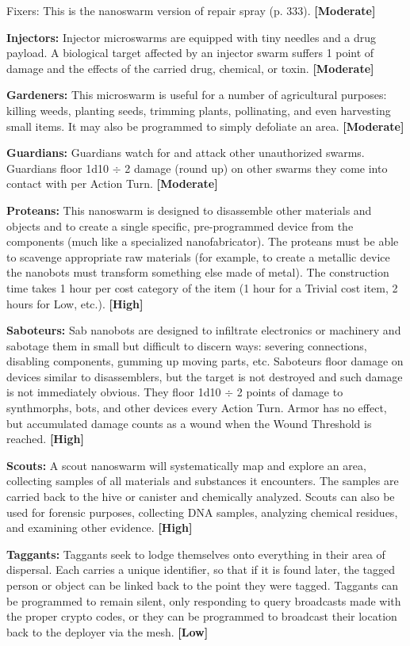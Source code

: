 Fixers: This is the nanoswarm version of repair spray (p. 333). \textbf{[Moderate]} 

\textbf{Injectors:} Injector microswarms are equipped with tiny needles and a drug payload. A biological target affected by an injector swarm suffers 1 point of damage and the effects of the carried drug, chemical, or toxin. \textbf{[Moderate]} 

\textbf{Gardeners:} This microswarm is useful for a number of agricultural purposes: killing weeds, planting seeds, trimming plants, pollinating, and even harvesting small items. It may also be programmed to simply defoliate an area. \textbf{[Moderate]} 

\textbf{Guardians:} Guardians watch for and attack other unauthorized swarms. Guardians floor 1d10 $\div$ 2 damage (round up) on other swarms they come into contact with per Action Turn. \textbf{[Moderate]} 

\textbf{Proteans:} This nanoswarm is designed to disassemble other materials and objects and to create a single specific, pre-programmed device from the components (much like a specialized nanofabricator). The proteans must be able to scavenge appropriate raw materials (for example, to create a metallic device the nanobots must transform something else made of metal). The construction time takes 1 hour per cost category of the item (1 hour for a Trivial cost item, 2 hours for Low, etc.). \textbf{[High]} 

\textbf{Saboteurs:} Sab nanobots are designed to infiltrate electronics or machinery and sabotage them in small but difficult to discern ways: severing connections, disabling components, gumming up moving parts, etc. Saboteurs floor damage on devices similar to disassemblers, but the target is not destroyed and such damage is not immediately obvious. They floor 1d10 $\div$ 2 points of damage to synthmorphs, bots, and other devices every Action Turn. Armor has no effect, but accumulated damage counts as a wound when the Wound Threshold is reached. \textbf{[High]} 

\textbf{Scouts:} A scout nanoswarm will systematically map and explore an area, collecting samples of all materials and substances it encounters. The samples are carried back to the hive or canister and chemically analyzed. Scouts can also be used for forensic purposes, collecting DNA samples, analyzing chemical residues, and examining other evidence. \textbf{[High]} 

\textbf{Taggants:} Taggants seek to lodge themselves onto everything in their area of dispersal. Each carries a unique identifier, so that if it is found later, the tagged person or object can be linked back to the point they were tagged. Taggants can be programmed to remain silent, only responding to query broadcasts made with the proper crypto codes, or they can be programmed to broadcast their location back to the deployer via the mesh. \textbf{[Low]} 



